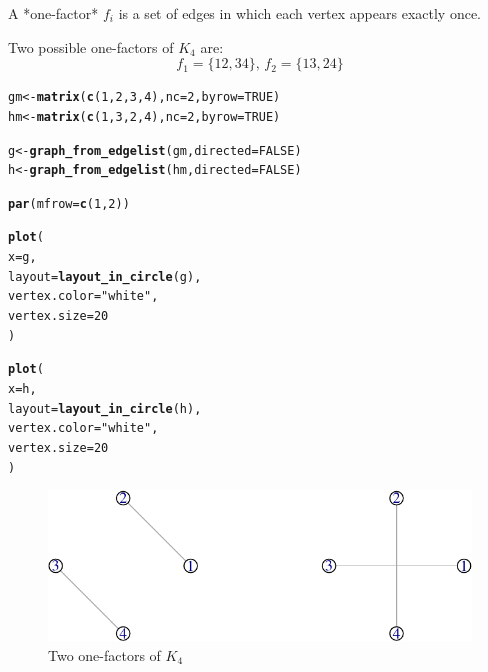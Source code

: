 \documentclass[
  11pt,
  a4paper]{book}\usepackage[]{graphicx}\usepackage[]{xcolor}
\makeatletter
\def\maxwidth{ %
  \ifdim\Gin@nat@width>\linewidth
    \linewidth
  \else
    \Gin@nat@width
  \fi
}
\newcommand{\hlnum}[1]{\textcolor[rgb]{0.686,0.059,0.569}{#1}}%
\newcommand{\hlstr}[1]{\textcolor[rgb]{0.192,0.494,0.8}{#1}}%
\newcommand{\hlstd}[1]{\textcolor[rgb]{0.345,0.345,0.345}{#1}}%
\newcommand{\hlkwb}[1]{\textcolor[rgb]{0.69,0.353,0.396}{#1}}%
\newcommand{\hlkwc}[1]{\textcolor[rgb]{0.333,0.667,0.333}{#1}}%
\newcommand{\hlkwd}[1]{\textcolor[rgb]{0.737,0.353,0.396}{\textbf{#1}}}%
\newenvironment{kframe}{%
 \def\at@end@of@kframe{}%
 \ifinner\ifhmode%
  \def\at@end@of@kframe{\end{minipage}}%
  \begin{minipage}{\columnwidth}%
 \fi\fi%
 \def\FrameCommand##1{\hskip\@totalleftmargin \hskip-\fboxsep
 \colorbox{shadecolor}{##1}\hskip-\fboxsep
     \hskip-\linewidth \hskip-\@totalleftmargin \hskip\columnwidth}%
 \MakeFramed {\advance\hsize-\width
   \@totalleftmargin\z@ \linewidth\hsize
   \@setminipage}}%
 {\par\unskip\endMakeFramed%
 \at@end@of@kframe}
\newenvironment{knitrout}{}{} %
\def\maxwidth{\ifdim\Gin@nat@width>\linewidth\linewidth\else\Gin@nat@width\fi}
\newcounter{example}
\makeatother
\begin{document}
A *one-factor* $f_i$ is a set of edges in which each vertex
appears exactly once.

\begin{example}
Two possible one-factors of $K_4$ are:
$$f_1 = \{12,34\},\, f_2 = \{13,24\}$$
\end{example}

\begin{knitrout}
\color{fgcolor}\begin{kframe}
\begin{alltt}
\hlstd{gm} \hlkwb{<-} \hlkwd{matrix}\hlstd{(} \hlkwd{c}\hlstd{(}\hlnum{1}\hlstd{,} \hlnum{2}\hlstd{,} \hlnum{3}\hlstd{,} \hlnum{4}\hlstd{),} \hlkwc{nc} \hlstd{=} \hlnum{2}\hlstd{,} \hlkwc{byrow} \hlstd{=} \hlnum{TRUE}\hlstd{)}
\hlstd{hm} \hlkwb{<-} \hlkwd{matrix}\hlstd{(} \hlkwd{c}\hlstd{(}\hlnum{1}\hlstd{,} \hlnum{3}\hlstd{,} \hlnum{2}\hlstd{,} \hlnum{4}\hlstd{),} \hlkwc{nc} \hlstd{=} \hlnum{2}\hlstd{,} \hlkwc{byrow} \hlstd{=} \hlnum{TRUE}\hlstd{)}

\hlstd{g} \hlkwb{<-} \hlkwd{graph_from_edgelist}\hlstd{(gm,} \hlkwc{directed} \hlstd{=} \hlnum{FALSE}\hlstd{)}
\hlstd{h} \hlkwb{<-} \hlkwd{graph_from_edgelist}\hlstd{(hm,} \hlkwc{directed} \hlstd{=} \hlnum{FALSE}\hlstd{)}

\hlkwd{par}\hlstd{(}\hlkwc{mfrow} \hlstd{=} \hlkwd{c}\hlstd{(}\hlnum{1}\hlstd{,} \hlnum{2}\hlstd{))}

\hlkwd{plot}\hlstd{(}
  \hlkwc{x}            \hlstd{= g,}
  \hlkwc{layout}       \hlstd{=} \hlkwd{layout_in_circle}\hlstd{(g),}
  \hlkwc{vertex.color} \hlstd{=} \hlstr{"white"}\hlstd{,}
  \hlkwc{vertex.size}  \hlstd{=} \hlnum{20}
\hlstd{)}

\hlkwd{plot}\hlstd{(}
  \hlkwc{x}            \hlstd{= h,}
  \hlkwc{layout}       \hlstd{=} \hlkwd{layout_in_circle}\hlstd{(h),}
  \hlkwc{vertex.color} \hlstd{=} \hlstr{"white"}\hlstd{,}
  \hlkwc{vertex.size}  \hlstd{=} \hlnum{20}
\hlstd{)}
\end{alltt}
\end{kframe}\begin{figure}
\includegraphics[width=\maxwidth]{figure/two-one-factors-1} \caption[Two one-factors of $K_{4}$]{Two one-factors of $K_{4}$}\label{fig:two-one-factors}
\end{figure}

\end{knitrout}
\end{document}
